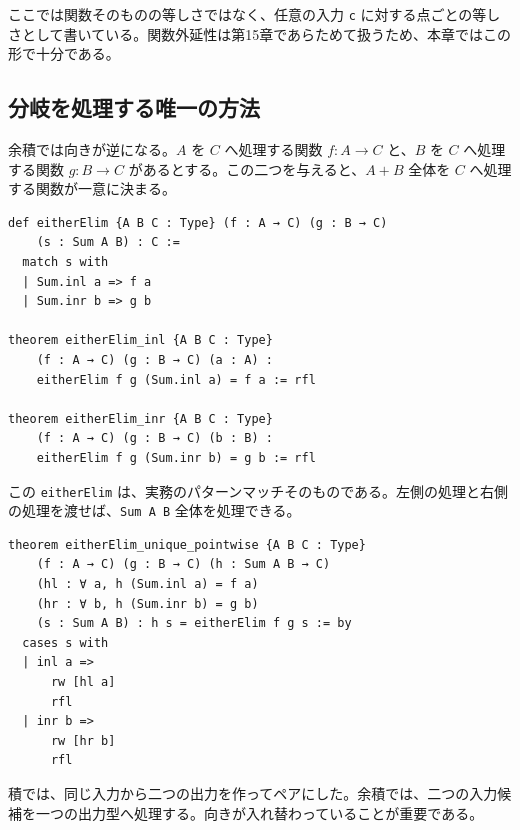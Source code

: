 ここでは関数そのものの等しさではなく、任意の入力 \texttt{c} に対する点ごとの等しさとして書いている。関数外延性は第15章であらためて扱うため、本章ではこの形で十分である。

\subsection{分岐を処理する唯一の方法}

余積では向きが逆になる。\(A\) を \(C\) へ処理する関数 \(f : A \to C\) と、\(B\) を \(C\) へ処理する関数 \(g : B \to C\) があるとする。この二つを与えると、\(A+B\) 全体を \(C\) へ処理する関数が一意に決まる。


\begin{listing}[htbp]
\begin{verbatim}
def eitherElim {A B C : Type} (f : A → C) (g : B → C)
    (s : Sum A B) : C :=
  match s with
  | Sum.inl a => f a
  | Sum.inr b => g b

theorem eitherElim_inl {A B C : Type}
    (f : A → C) (g : B → C) (a : A) :
    eitherElim f g (Sum.inl a) = f a := rfl

theorem eitherElim_inr {A B C : Type}
    (f : A → C) (g : B → C) (b : B) :
    eitherElim f g (Sum.inr b) = g b := rfl
\end{verbatim}
\caption{余積の普遍性を関数として表す}
\label{lst:ch07_coproduct_universal}
\end{listing}

この \texttt{eitherElim} は、実務のパターンマッチそのものである。左側の処理と右側の処理を渡せば、\texttt{Sum A B} 全体を処理できる。

\begin{listing}[htbp]
\begin{verbatim}
theorem eitherElim_unique_pointwise {A B C : Type}
    (f : A → C) (g : B → C) (h : Sum A B → C)
    (hl : ∀ a, h (Sum.inl a) = f a)
    (hr : ∀ b, h (Sum.inr b) = g b)
    (s : Sum A B) : h s = eitherElim f g s := by
  cases s with
  | inl a =>
      rw [hl a]
      rfl
  | inr b =>
      rw [hr b]
      rfl
\end{verbatim}
\caption{余積から作る関数の点ごとの一意性}
\label{lst:ch07_coproduct_unique}
\end{listing}

積では、同じ入力から二つの出力を作ってペアにした。余積では、二つの入力候補を一つの出力型へ処理する。向きが入れ替わっていることが重要である。

